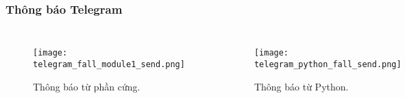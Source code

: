 \begin{frame}[t,fragile]
\frametitle{Thông báo Telegram}
\begin{columns}[T]
    \begin{figure}[H]
        \centering
        \texttt{[image: telegram\_fall\_module1\_send.png]}
        \caption{Thông báo từ phần cứng.}
    \end{figure}
    \begin{figure}[H]
        \centering
        \texttt{[image: telegram\_python\_fall\_send.png]}
        \caption{Thông báo từ Python.}
    \end{figure}
\end{columns}
\end{frame}
